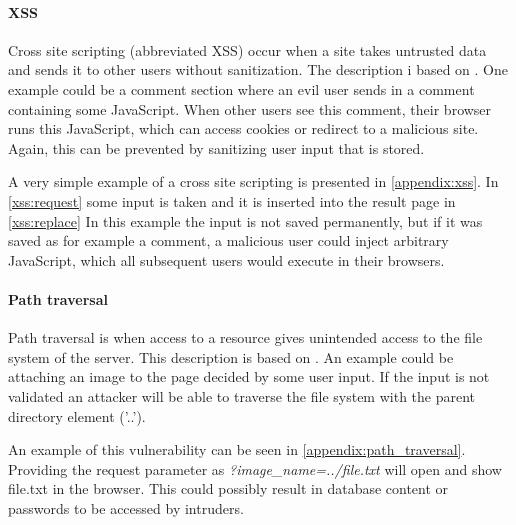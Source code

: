 \paragraph{XSS}
Cross site scripting (abbreviated XSS) occur when a site takes untrusted data and sends it to other users without sanitization.
The description i based on \citet{crosssitescripting}.
One example could be a comment section where an evil user sends in a comment containing some JavaScript.
When other users see this comment, their browser runs this JavaScript, which can access cookies or redirect to a malicious site.
Again, this can be prevented by sanitizing user input that is stored.

A very simple example of a cross site scripting is presented in \cref{appendix:xss}.
In \cref{xss:request} some input is taken and it is inserted into the result page in \cref{xss:replace}
In this example the input is not saved permanently, but if it was saved as for example a comment, a malicious user could inject arbitrary JavaScript, which all subsequent users would execute in their browsers.

\paragraph{Path traversal}
Path traversal is when access to a resource gives unintended access to the file system of the server.
This description is based on \citet{pathtraversal}.
An example could be attaching an image to the page decided by some user input.
If the input is not validated an attacker will be able to traverse the file system with the parent directory element ('..'). 

An example of this vulnerability can be seen in \cref{appendix:path_traversal}.
Providing the request parameter as \emph{?image\_name=../file.txt} will open and show file.txt in the browser.
This could possibly result in database content or passwords to be accessed by intruders.


